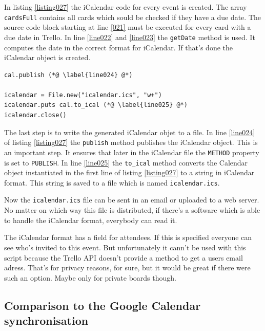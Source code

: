 In listing \ref{listing027} the iCalendar code for every event is created. The array \lstinline{cardsFull} contains all cards which sould be checked if they have a due date. The source code block starting at line \ref{021} must be executed for every card with a due date in Trello. In line \ref{line022} and \ref{line023} the \lstinline{getDate} method is used. It computes the date in the correct format for iCalendar. If that's done the iCalendar object is created. 

\begin{lstlisting}[aboveskip=1\baselineskip, style=bash, caption=Saving the iCalendar file., label=listing027]
cal.publish (*@ \label{line024} @*)

icalendar = File.new("icalendar.ics", "w+")
icalendar.puts cal.to_ical (*@ \label{line025} @*)
icalendar.close()
\end{lstlisting}

The last step is to write the generated iCalendar objet to a file. In line \ref{line024} of listing \ref{listing027} the \lstinline{publish} method publishes the iCalendar object. This is an important step. It ensures that later in the iCalendar file the \lstinline{METHOD} property is set to \lstinline{PUBLISH}. In line \ref{line025} the \lstinline{to_ical} method converts the Calendar object instantiated in the first line of listing \ref{listing027} to  a string in iCalendar format. This string is saved to a file which is named \lstinline{icalendar.ics}. \cite{ical:gemdocu}

Now the \lstinline{icalendar.ics} file can be sent in an email or uploaded to a web server. No matter on which way this file is distributed, if there's a software which is able to handle the iCalendar format, everybody can read it.

The iCalendar format has a field for attendees. If this is specified everyone can see who's invited to this event. But unfortunately it cann't be used with this script because the Trello API doesn't provide a method to get a users email adress. That's for privacy reasons, for sure, but it would be great if there were such an option. Maybe only for private boards though.

\subsection{Comparison to the Google Calendar synchronisation} 

